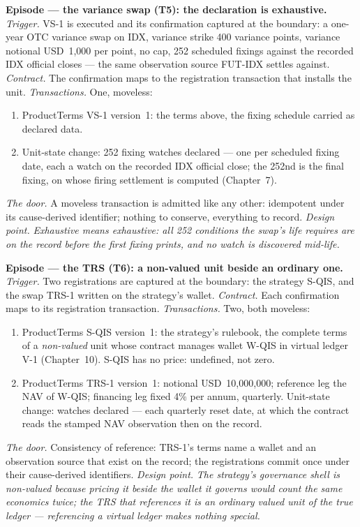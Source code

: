 \documentclass[11pt,a4paper]{article}
\newcommand{\USD}[1]{\mbox{USD~#1}}
\begin{document}
\medskip\noindent\textbf{Episode --- the variance swap (T5): the declaration is
exhaustive.}
\emph{Trigger.} VS-1 is executed and its confirmation captured at the boundary: a
one-year OTC variance swap on IDX, variance strike 400 variance points, variance
notional \USD{1{,}000} per point, no cap, 252 scheduled fixings against the recorded IDX
official closes --- the same observation source FUT-IDX settles against.
\emph{Contract.} The confirmation maps to the registration transaction that installs the
unit.
\emph{Transactions.} One, moveless:
\begin{enumerate}[nosep,leftmargin=2.2em]
\item ProductTerms VS-1 version~1: the terms above, the fixing schedule carried as
  declared data.
\item Unit-state change: 252 fixing watches declared --- one per scheduled fixing date,
  each a watch on the recorded IDX official close; the 252nd is the final fixing, on
  whose firing settlement is computed (Chapter~7).
\end{enumerate}
\emph{The door.} A moveless transaction is admitted like any other: idempotent under its
cause-derived identifier; nothing to conserve, everything to record.
\emph{Design point.} \emph{Exhaustive means exhaustive: all 252 conditions the swap's
life requires are on the record before the first fixing prints, and no watch is
discovered mid-life.}

\medskip\noindent\textbf{Episode --- the TRS (T6): a non-valued unit beside an ordinary
one.}
\emph{Trigger.} Two registrations are captured at the boundary: the strategy S-QIS, and
the swap TRS-1 written on the strategy's wallet.
\emph{Contract.} Each confirmation maps to its registration transaction.
\emph{Transactions.} Two, both moveless:
\begin{enumerate}[nosep,leftmargin=2.2em]
\item ProductTerms S-QIS version~1: the strategy's rulebook, the complete terms of a
  \emph{non-valued} unit whose contract manages wallet W-QIS in virtual ledger V-1
  (Chapter~10). S-QIS has no price: undefined, not zero.
\item ProductTerms TRS-1 version~1: notional \USD{10{,}000{,}000}; reference leg the NAV
  of W-QIS; financing leg fixed 4\% per annum, quarterly. Unit-state change: watches
  declared --- each quarterly reset date, at which the contract reads the stamped NAV
  observation then on the record.
\end{enumerate}
\emph{The door.} Consistency of reference: TRS-1's terms name a wallet and an
observation source that exist on the record; the registrations commit once under their
cause-derived identifiers.
\emph{Design point.} \emph{The strategy's governance shell is non-valued because pricing
it beside the wallet it governs would count the same economics twice; the TRS that
references it is an ordinary valued unit of the true ledger --- referencing a virtual
ledger makes nothing special.}
\end{document}
